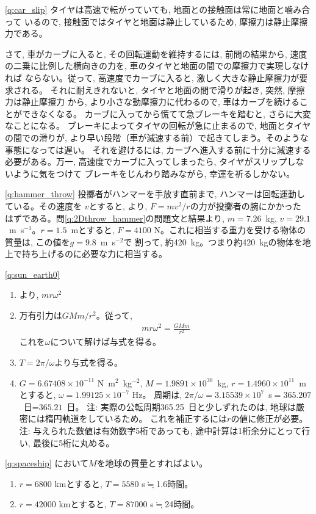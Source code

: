 %
\ref{q:car_slip}
タイヤは高速で転がっていても, 地面との接触面は常に地面と噛み合って
いるので, 接触面ではタイヤと地面は静止しているため, 摩擦力は静止摩擦力である。

さて, 車がカーブに入ると, その回転運動を維持するには, 前問の結果から, 
速度の二乗に比例した横向きの力を, 車のタイヤと地面の間での摩擦力で実現しなければ
ならない。従って, 高速度でカーブに入ると, 激しく大きな静止摩擦力が要求される。
それに耐えきれないと, タイヤと地面の間で滑りが起き, 突然, 摩擦力は静止摩擦力
から, より小さな動摩擦力に代わるので, 車はカーブを続けることができなくなる。
カーブに入ってから慌てて急ブレーキを踏むと, さらに大変なことになる。
ブレーキによってタイヤの回転が急に止まるので, 地面とタイヤの間での滑りが, 
より早い段階（車が減速する前）で起きてしまう。そのような事態になっては遅い。
それを避けるには, カーブへ進入する前に十分に減速する必要がある。万一, 
高速度でカーブに入ってしまったら, タイヤがスリップしないように気をつけて
ブレーキをじんわり踏みながら, 幸運を祈るしかない。
\mv

%
\ref{q:hammer_throw}
投擲者がハンマーを手放す直前まで, ハンマーは回転運動している。その速度を
$v$とすると, より, $F=mv^2/r$の力が投擲者の腕にかかった
はずである。問\ref{q:2Dthrow_hammer}の問題文と結果より, $m=7.26$~kg, $v=29.1$~m~s$^{-1}$。$r=1.5$~mとすると, 
$F=4100$ N。これに相当する重力を受ける物体の質量は, この値を$g=9.8$~m~s$^{-2}$で
割って, 約420~kg。つまり約420~kgの物体を地上で持ち上げるのに必要な力に相当する。
\mv

%
\ref{q:sun_earth0}
\begin{enumerate}
\item {}より, $mr\omega^2$
\item 万有引力は$GMm/r^2$。従って, 
\begin{eqnarray}mr\omega^2=\frac{GMm}{r^2}\end{eqnarray}
これを$\omega$について解けば与式を得る。
\item $T=2\pi/\omega$より与式を得る。
\item $G=6.67408\times10^{-11}$ N~m$^2$~kg$^{-2}$, $M=1.9891\times10^{30}$~kg, 
$r=1.4960\times10^{11}$~mとすると, $\omega=1.99125\times10^{-7}$ Hz。
周期は, $2\pi/\omega=3.15539\times10^7$~s$=365.207$~日=$365.21$~日。
注: 実際の公転周期365.25~日と少しずれたのは, 地球は厳密には楕円軌道をしているため。
これを補正するには$r$の値に修正が必要。
注: 与えられた数値は有効数字5桁であっても, 途中計算は1桁余分にとって行い, 最後に5桁に丸める。
\end{enumerate}
\mv

%
\ref{q:spaceship}
において$M$を地球の質量とすればよい。
\begin{enumerate}
\item $r=6800$ kmとすると, $T=5580$ s$\fallingdotseq$1.6時間。
\item $r=42000$ kmとすると, $T=87000$ s$\fallingdotseq$24時間。
\end{enumerate}

